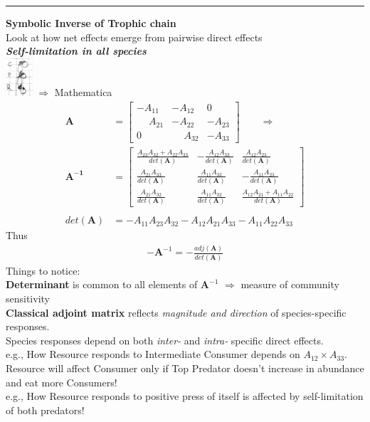 \documentclass{article}
\newcommand{\note}[1]{\colorbox{gray!30}{#1}}
\newcommand{\ind}{\-\hspace{1cm}}
\begin{document}
\rule[0.5ex]{\linewidth}{1pt}
\textbf{Symbolic Inverse of Trophic chain}\\
\ind Look at how net effects emerge from pairwise direct effects\\
\emph{\textbf{Self-limitation in all species}}\\
\includegraphics[width=1cm]{figs/TC_full.pdf}
\note{$\Rightarrow$ Mathematica}
\begin{align*}
	\mathbf{A}&=\begin{bmatrix} -A_{11} & -A_{12} & 0 \\ \phantom{-}A_{21} & -A_{22} & -A_{23} \\ 0 & \phantom{-}A_{32} & -A_{33} \end{bmatrix} \qquad \Rightarrow \qquad \\
	\mathbf{A^{-1}}&=
	\begin{bmatrix}
 \frac{A_{23} A_{32}+A_{22} A_{33}}{det(\mathbf{A})} & -\frac{A_{12} A_{33}}{det(\mathbf{A})} & \frac{A_{12} A_{23}}{det(\mathbf{A})} \\
 \frac{A_{21} A_{33}}{det(\mathbf{A})} & \frac{A_{11} A_{33}}{det(\mathbf{A})} & -\frac{A_{11} A_{23}}{det(\mathbf{A})} \\
 \frac{A_{21} A_{32}}{det(\mathbf{A})} & \frac{A_{11} A_{32}}{det(\mathbf{A})} & \frac{A_{12} A_{21}+A_{11} A_{22}}{det(\mathbf{A})}\end{bmatrix}\\
 \\
 det(\mathbf{A})&=-A_{11} A_{23} A_{32}-A_{12} A_{21} A_{33}-A_{11} A_{22} A_{33}
\end{align*}
Thus
\begin{align*}
	-\mathbf{A}^{-1}=-\frac{adj(\mathbf{A})}{det(\mathbf{A})}
\end{align*}
Things to notice:\\
\textbf{Determinant} is common to all elements of $\mathbf{A}^{-1}$ $\Rightarrow$ measure of community sensitivity\\
\textbf{Classical adjoint matrix} reflects \emph{magnitude and direction} of species-specific responses.\\
Species responses depend on both \emph{inter-} and \emph{intra-} specific direct effects.\\

e.g., How Resource responds to Intermediate Consumer depends on  $A_{12} \times A_{33}$.\\
Resource will affect Consumer only if Top Predator doesn't increase in abundance and eat more Consumers!\\
e.g., How Resource responds to positive press of itself is affected by self-limitation of both predators!
\end{document}
